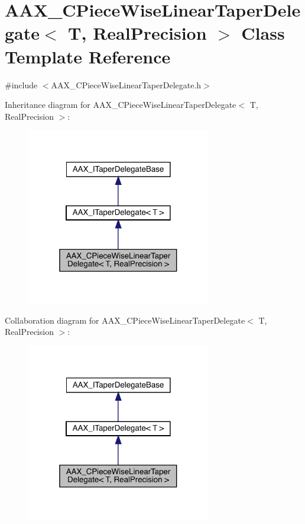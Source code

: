 \hypertarget{a01553}{}\section{A\+A\+X\+\_\+\+C\+Piece\+Wise\+Linear\+Taper\+Delegate$<$ T, Real\+Precision $>$ Class Template Reference}
\label{a01553}


{\ttfamily \#include $<$A\+A\+X\+\_\+\+C\+Piece\+Wise\+Linear\+Taper\+Delegate.\+h$>$}



Inheritance diagram for A\+A\+X\+\_\+\+C\+Piece\+Wise\+Linear\+Taper\+Delegate$<$ T, Real\+Precision $>$\+:
\nopagebreak
\begin{figure}[H]
\begin{center}
\leavevmode
\includegraphics[width=229pt]{a01552}
\end{center}
\end{figure}


Collaboration diagram for A\+A\+X\+\_\+\+C\+Piece\+Wise\+Linear\+Taper\+Delegate$<$ T, Real\+Precision $>$\+:
\nopagebreak
\begin{figure}[H]
\begin{center}
\leavevmode
\includegraphics[width=229pt]{a01551}
\end{center}
\end{figure}


